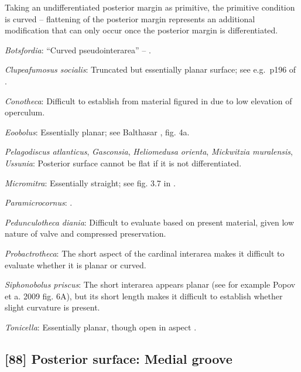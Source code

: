 \documentclass[openany]{book}
\theoremstyle{definition}
\theoremstyle{definition}
\theoremstyle{definition}
\theoremstyle{remark}
\begin{document}
Taking an undifferentiated posterior margin as primitive, the primitive
condition is curved -- flattening of the posterior margin represents an
additional modification that can only occur once the posterior margin is
differentiated.

\hypertarget{Botsfordia-coding-87}{}
\emph{Botsfordia}: ``Curved pseudointerarea'' --
\citet{Skovsted2017Depthrelated}.

\hypertarget{Clupeafumosus_socialis-coding-87}{}
\emph{Clupeafumosus socialis}: Truncated but essentially planar surface;
see e.g.~p196 of \citet{Topper2013Reappraisalof}.

\hypertarget{Conotheca-coding-87}{}
\emph{Conotheca}: Difficult to establish from material figured in
\citet{Devaere2014} due to low elevation of operculum.

\hypertarget{Eoobolus-coding-87}{}
\emph{Eoobolus}: Essentially planar; see Balthasar
\citeyearpar{Balthasar2009Thebrachiopod}, fig. 4a.

\hypertarget{Gasconsia-coding-87}{}
\emph{Pelagodiscus atlanticus}, \emph{Gasconsia}, \emph{Heliomedusa
orienta}, \emph{Mickwitzia muralensis}, \emph{Ussunia}: Posterior
surface cannot be flat if it is not differentiated.

\hypertarget{Micromitra-coding-87}{}
\emph{Micromitra}: Essentially straight; see fig. 3.7 in
\citet{Ushatinskaya2016Protegulumand}.

\hypertarget{Paramicrocornus-coding-87}{}
\emph{Paramicrocornus}: \citet{Zhang2018Ahyolithid}.

\hypertarget{Pedunculotheca_diania-coding-87}{}
\emph{Pedunculotheca diania}: Difficult to evaluate based on present
material, given low nature of valve and compressed preservation.

\hypertarget{Probactrotheca-coding-87}{}
\emph{Probactrotheca}: The short aspect of the cardinal interarea
\citep{Valent2012} makes it difficult to evaluate whether it is planar
or curved.

\hypertarget{Siphonobolus_priscus-coding-87}{}
\emph{Siphonobolus priscus}: The short interarea appears planar (see for
example Popov et a. 2009 fig. 6A), but its short length makes it
difficult to establish whether slight curvature is present.

\hypertarget{Tonicella-coding-87}{}
\emph{Tonicella}: Essentially planar, though open in aspect
\citep[following Chiton in][]{Schwabe2010}.

\subsection*{{[}88{]} Posterior surface: Medial
groove}\label{posterior-surface-medial-groove}
\end{document}
